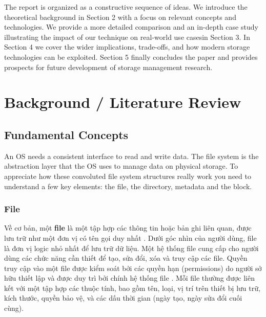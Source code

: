 \documentclass[12pt]{article}
\begin{document}
The report is organized as a constructive sequence of ideas. We introduce the theoretical background in Section 2 with a focus on relevant concepts and technologies. We provide a more detailed comparison and an in-depth case study illustrating the impact of our technique on real-world use casesin Section 3. In Section 4 we cover the wider implications, trade-offs, and how modern storage technologies can be exploited. Section 5 finally concludes the paper and provides prospects for future development of storage management research.


\section{Background / Literature Review}

\subsection{Fundamental Concepts}

An OS needs a consistent interface to read and write data. The file system is the abstraction layer that the OS uses to manage data on physical storage. To appreciate how these convoluted file system structures really work you need to understand a few key elements: the file, the directory, metadata and the block.

\subsubsection{File}
Về cơ bản, một \textbf{file} là một tập hợp các thông tin hoặc bản ghi liên quan, được lưu trữ như một đơn vị có tên gọi duy nhất \parencite{EMC2012InformationStorage}. Dưới góc nhìn của người dùng, file là đơn vị logic nhỏ nhất để lưu trữ dữ liệu. Một hệ thống file cung cấp cho người dùng các chức năng cần thiết để tạo, sửa đổi, xóa và truy cập các file. Quyền truy cập vào một file được kiểm soát bởi các quyền hạn (permissions) do người sở hữu thiết lập và được duy trì bởi chính hệ thống file \parencite{Silberschatz2018}. Mỗi file thường được liên kết với một tập hợp các thuộc tính, bao gồm tên, loại, vị trí trên thiết bị lưu trữ, kích thước, quyền bảo vệ, và các dấu thời gian (ngày tạo, ngày sửa đổi cuối cùng).
\end{document}
